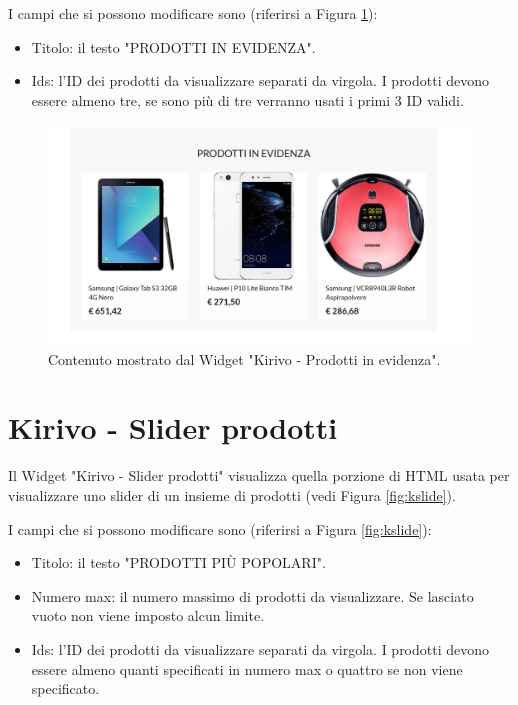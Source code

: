 I campi che si possono modificare sono (riferirsi a Figura \ref{fig:kevid}):
\begin{itemize}
\item Titolo: il testo "PRODOTTI IN EVIDENZA".
\item Ids: l'ID dei prodotti da visualizzare separati da virgola. I prodotti devono
essere almeno tre, se sono più di tre verranno usati i primi 3 ID validi.
\end{itemize}

\begin{figure}
  \includegraphics[width=\textwidth]{figure/kevid.png}
  \caption{Contenuto mostrato dal Widget "Kirivo - Prodotti in evidenza".}
  \label{fig:kevid}
\end{figure}

\newpage
\section{Kirivo - Slider prodotti}


Il Widget "Kirivo - Slider prodotti"   visualizza quella porzione di HTML usata
per visualizzare uno slider di un insieme di prodotti (vedi Figura \ref{fig:kslide}).

I campi che si possono modificare sono (riferirsi a Figura \ref{fig:kslide}):
\begin{itemize}
\item Titolo: il testo "PRODOTTI PIÙ POPOLARI".
\item Numero max: il numero massimo di prodotti da visualizzare. Se lasciato vuoto non viene imposto alcun limite.
\item Ids: l'ID dei prodotti da visualizzare separati da virgola. I prodotti devono
essere almeno quanti specificati in numero max o quattro se non viene specificato.
\end{itemize}

